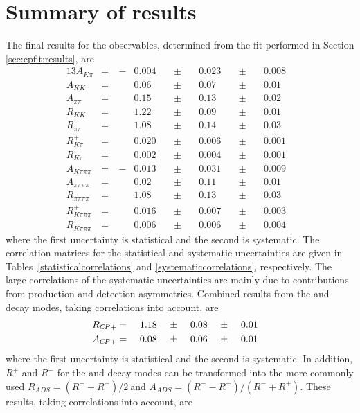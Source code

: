 \section{Summary of results}
\label{sec:cpfit:summary}

The final results for the \CP observables, determined from the \CP fit performed in Section \ref{sec:cpfit:results}, are  
\begin{alignat*}{13}
A_{K\pi} &= &\ -&0.004&\ &\pm&\ &0.023&\ &\pm&\ &0.008& \\
A_{KK} &= &&0.06&\ &\pm&\ &0.07&\ &\pm&\ &0.01& \\
A_{\pi\pi} &= &&0.15&\ &\pm&\ &0.13&\ &\pm&\ &0.02& \\
R_{KK} &= &&1.22&\ &\pm&\ &0.09&\ &\pm&\ &0.01& \\
R_{\pi\pi} &= &&1.08&\ &\pm&\ &0.14&\ &\pm&\ &0.03& \\
R^+_{K\pi} &= &&0.020&\ &\pm&\ &0.006&\ &\pm&\ &0.001& \\ 
R^-_{K\pi} &= &&0.002&\ &\pm&\ &0.004&\ &\pm&\ &0.001& \\
A_{K\pi\pi\pi} &= &\ -&0.013&\ &\pm&\ &0.031&\ &\pm&\ &0.009& \\
A_{\pi\pi\pi\pi} &= &&0.02&\ &\pm&\ &0.11&\ &\pm&\ &0.01& \\
R_{\pi\pi\pi\pi} &= &&1.08&\ &\pm&\ &0.13&\ &\pm&\ &0.03& \\
R^+_{K\pi\pi\pi} &= &&0.016&\ &\pm&\ &0.007&\ &\pm&\ &0.003& \\ 
R^-_{K\pi\pi\pi} &= &&0.006&\ &\pm&\ &0.006&\ &\pm&\ &0.004&
\end{alignat*}
where the first uncertainty is statistical and the second is systematic. The correlation matrices for the statistical and systematic uncertainties are given in Tables~\ref{statisticalcorrelations} and \ref{systematiccorrelations}, respectively. The large correlations of the systematic uncertainties are mainly due to contributions from production and detection asymmetries. Combined results from the \Kp\Km and \pip\pim decay modes, taking correlations into account, are
\begin{alignat*}{13}
R_{\CP+} &= &\ &1.18&\ &\pm&\ &0.08&\ &\pm&\ &0.01& \\
A_{\CP+} &= &\ &0.08&\ &\pm&\ &0.06&\ &\pm&\ &0.01&
\end{alignat*}
where the first uncertainty is statistical and the second is systematic. In addition, $R^+$ and $R^-$ for the \Kp\pim and \Kp\pim\pip\pim decay modes can be transformed into the more commonly used $R_{ADS} = \left(R^- + R^+\right)/2\ $and \mbox{$A_{ADS} = \left(R^- - R^+\right)/\left(R^- + R^+\right)$}. These results, taking correlations into account, are
